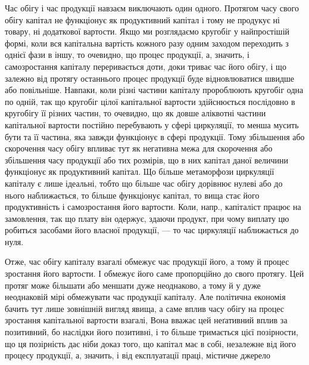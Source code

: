 Час обігу і час продукції навзаєм виключають один одного. Протягом
часу свого обігу капітал не функціонує як продуктивний капітал і тому
не продукує ні товару, ні додаткової вартости. Якщо ми розглядаємо
кругобіг у найпростішій формі, коли вся капітальна вартість кожного разу
одним заходом переходить з однієї фази в іншу, то очевидно, що процес
продукції, а, значить, і самозростання капіталу переривається доти, доки
триває час його обігу, і що залежно від протягу останнього процес продукції
буде відновлюватися швидше або повільніше. Навпаки, коли різні
частини капіталу пророблюють кругобіг одна по одній, так що кругобіг
цілої капітальної вартости здійснюється послідовно в кругобігу її
різних частин, то очевидно, що як довше аліквотні частини капітальної
вартости постійно перебувають у сфері циркуляції, то менша
мусить бути та її частина, яка завжди функціонує в сфері
продукції. Тому збільшення або скорочення часу обігу впливає тут як
негативна межа для скорочення або збільшення часу продукції або тих
розмірів, що в них капітал даної величини функціонує як продуктивний
капітал. Що більше метаморфози циркуляції капіталу є лише ідеальні,
тобто що більше час обігу дорівнює нулеві або до нього наближається,
то більше функціонує капітал, то вища стає його продуктивність і самозростання
його вартости. Коли, напр., капіталіст працює на замовлення, так
що плату він одержує, здаючи продукт, при чому виплату цю робиться
засобами його власної продукції, — то час циркуляції наближається до
нуля.

Отже, час обігу капіталу взагалі обмежує час продукції його, а тому
й процес зростання його вартости. І обмежує його саме пропорційно
до свого протягу. Цей протяг може більшати або меншати дуже неоднаково,
а тому й у дуже неоднаковій мірі обмежувати час
продукції капіталу. Але політична економія бачить тут лише зовнішній
вигляд явища, а саме вплив часу обігу на процес зростання капітальної
вартости взагалі, Вона вважає цей неґативний вплив за позитивний, бо
наслідки його позитивні, і то більше тримається цієї позірности, що ця позірність
дає ніби доказ того, що капітал має в собі, незалежне від його
процесу продукції, а, значить, і від експлуатації праці, містичне джерело
\parbreak{}  %
